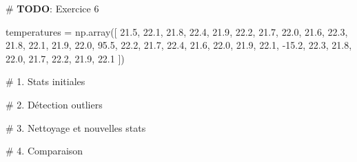 \documentclass[
  french,
  11pt,
  a4paper,
]{scrbook}
\newenvironment{Shaded}{}{}
\newcommand{\AlertTok}[1]{\textcolor[rgb]{1.00,0.33,0.33}{\textbf{#1}}}
\newcommand{\CommentTok}[1]{\textcolor[rgb]{0.42,0.45,0.49}{#1}}
\newcommand{\FloatTok}[1]{\textcolor[rgb]{0.00,0.36,0.77}{#1}}
\newcommand{\NormalTok}[1]{\textcolor[rgb]{0.14,0.16,0.18}{#1}}
\newcommand{\OperatorTok}[1]{\textcolor[rgb]{0.14,0.16,0.18}{#1}}
\begin{document}
\begin{Shaded}
\begin{Highlighting}[]
\CommentTok{\# }\AlertTok{TODO}\CommentTok{: Exercice 6}

\NormalTok{temperatures }\OperatorTok{=}\NormalTok{ np.array([}
    \FloatTok{21.5}\NormalTok{, }\FloatTok{22.1}\NormalTok{, }\FloatTok{21.8}\NormalTok{, }\FloatTok{22.4}\NormalTok{, }\FloatTok{21.9}\NormalTok{, }\FloatTok{22.2}\NormalTok{, }\FloatTok{21.7}\NormalTok{, }\FloatTok{22.0}\NormalTok{, }\FloatTok{21.6}\NormalTok{, }\FloatTok{22.3}\NormalTok{,}
    \FloatTok{21.8}\NormalTok{, }\FloatTok{22.1}\NormalTok{, }\FloatTok{21.9}\NormalTok{, }\FloatTok{22.0}\NormalTok{, }\FloatTok{95.5}\NormalTok{, }\FloatTok{22.2}\NormalTok{, }\FloatTok{21.7}\NormalTok{, }\FloatTok{22.4}\NormalTok{, }\FloatTok{21.6}\NormalTok{, }\FloatTok{22.0}\NormalTok{,}
    \FloatTok{21.9}\NormalTok{, }\FloatTok{22.1}\NormalTok{, }\OperatorTok{{-}}\FloatTok{15.2}\NormalTok{, }\FloatTok{22.3}\NormalTok{, }\FloatTok{21.8}\NormalTok{, }\FloatTok{22.0}\NormalTok{, }\FloatTok{21.7}\NormalTok{, }\FloatTok{22.2}\NormalTok{, }\FloatTok{21.9}\NormalTok{, }\FloatTok{22.1}
\NormalTok{])}

\CommentTok{\# 1. Stats initiales}


\CommentTok{\# 2. Détection outliers}


\CommentTok{\# 3. Nettoyage et nouvelles stats}


\CommentTok{\# 4. Comparaison}
\end{Highlighting}
\end{Shaded}
\end{document}
